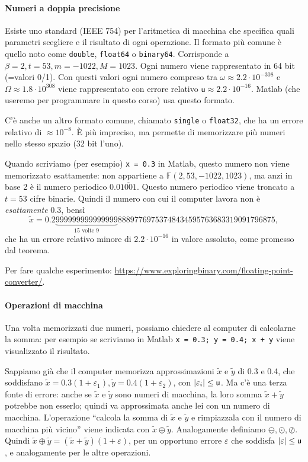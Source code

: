 \documentclass[a4paper]{report}
\DeclarePairedDelimiter{\abs}{\lvert}{\rvert}
\theoremstyle{definiton}
\theoremstyle{remark}
\begin{document}
\paragraph{Numeri a doppia precisione}
Esiste uno standard (IEEE 754) per l'aritmetica di macchina che specifica quali parametri scegliere e il risultato di ogni operazione. Il formato più comune è quello noto come \texttt{double}, \texttt{float64} o \texttt{binary64}. Corrisponde a $\beta = 2, t=53, m=-1022, M = 1023$. Ogni numero viene rappresentato in 64 bit (=valori 0/1). Con questi valori ogni numero compreso tra $\omega \approx 2.2 \cdot 10^{-308}$ e $\Omega \approx 1.8 \cdot 10^{308}$ viene rappresentato con errore relativo $\mathsf{u} \approx 2.2 \cdot 10^{-16}$. Matlab (che useremo per programmare in questo corso) usa questo formato.

C'è anche un altro formato comune, chiamato \texttt{single} o \texttt{float32}, che ha un errore relativo di $\approx 10^{-8}$. È più impreciso, ma permette di memorizzare più numeri nello stesso spazio (32 bit l'uno).

Quando scriviamo (per esempio) \texttt{x = 0.3} in Matlab, questo numero non viene memorizzato esattamente: non appartiene a $\mathbb{F}(2, 53, -1022, 1023)$, ma anzi in base 2 è il numero periodico $0.0\overline{1001}$. Questo numero periodico viene troncato a $t=53$ cifre binarie. Quindi il numero con cui il computer lavora non è \emph{esattamente} $0.3$, bensì
\[
\tilde{x} = 0.2\underbrace{999999999999999}_{\text{15 volte 9}}88897769753748434595763683319091796875,
\]
che ha un errore relativo minore di $2.2 \cdot 10^{-16}$ in valore assoluto, come promesso dal teorema.

Per fare qualche esperimento: \url{https://www.exploringbinary.com/floating-point-converter/}.

\paragraph{Operazioni di macchina}

Una volta memorizzati due numeri, possiamo chiedere al computer di calcolarne la somma: per esempio se scriviamo in Matlab
\texttt{x = 0.3; y = 0.4; x + y} viene visualizzato il risultato.

Sappiamo già che il computer memorizza approssimazioni $\tilde{x}$ e $\tilde{y}$ di 0.3 e 0.4, che soddisfano $\tilde{x} = 0.3(1+\varepsilon_1), \tilde{y} = 0.4(1+\varepsilon_2)$, con $\abs{\varepsilon_i} \leq \mathsf{u}$. Ma c'è una terza fonte di errore: anche se $\tilde{x}$ e $\tilde{y}$ sono numeri di macchina, la loro somma $\tilde{x} + \tilde{y}$ potrebbe non esserlo; quindi va approssimata anche lei con un numero di macchina. L'operazione ``calcola la somma di $\tilde{x}$ e $\tilde{y}$ e rimpiazzala con il numero di macchina più vicino'' viene indicata con $\tilde{x} \oplus \tilde{y}$. Analogamente definiamo $\ominus, \odot, \oslash$. Quindi $ \tilde{x} \oplus \tilde{y} = (\tilde{x}+\tilde{y})(1+\varepsilon)$, per un opportuno errore $\varepsilon$ che soddisfa $\abs{\varepsilon} \leq \mathsf{u}$, e analogamente per le altre operazioni.
\end{document}
